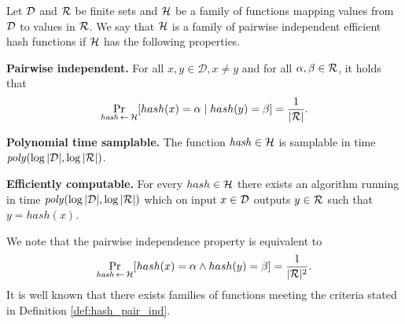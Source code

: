 \begin{definition}
  \label{def:hash_pair_ind}
Let $\mathcal{D}$ and $\mathcal{R}$ be finite sets and $\mathcal{H}$ be a family of functions mapping values from $\mathcal{D}$ to values in $\mathcal{R}$.
We say that $\mathcal{H}$ is a \textnormal{family of pairwise independent efficient hash functions}
if $\mathcal{H}$ has the following properties.

\textbf{Pairwise independent.} For all $x, y \in \mathcal{D}, x \neq y$ and for all $\alpha, \beta \in \mathcal{R}$, it holds that
\begin{displaymath}
\underset{\hash \la0 \cH}{\Pr}[hash(x) = \alpha \mid hash(y) = \beta] = \frac{1}{|\cR|}.
\end{displaymath}

\textbf{Polynomial time samplable.} The function $\mathit{hash} \in \mathcal{H}$ is samplable in time $\operatorname{\mathit{poly}}(\log|\mathcal{D}|, \log|\mathcal{R}|)$.

\textbf{Efficiently computable.}
For every $hash \in \mathcal{H}$ there exists an algorithm running in time $\mathit{poly}(\log|\mathcal{D}|, \log|\mathcal{R}|)$ which
on input $x \in \mathcal{D}$ outputs $y \in \mathcal{R}$ such that $y = hash(x)$.
\end{definition}

We note that the pairwise independence property is equivalent to
\begin{displaymath}
\underset{\hash \la0 \cH}{\Pr}[hash(x) = \alpha \land hash(y) = \beta] = \frac{1}{|\cR|^2}.
\end{displaymath}
It is well known \cite{Carter:1977:UCH:800105.803400} that there exists families of functions meeting the criteria stated in Definition \ref{def:hash_pair_ind}.


